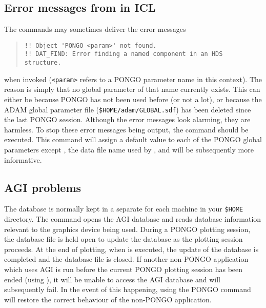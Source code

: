 \subsection{Error messages from  in ICL}

The commands  may sometimes deliver the error messages
\begin{quote}
\begin{verbatim}
!! Object 'PONGO_<param>' not found.
!! DAT_FIND: Error finding a named component in an HDS structure.
\end{verbatim}
\end{quote}
when invoked (\verb+<param>+ refers to a PONGO parameter name in this
context).
The reason is simply that no global parameter of that name currently exists.
This can either be because PONGO has not been used before (or not a lot),
or because the ADAM global parameter file (\verb+$HOME/adam/GLOBAL.sdf+) has
been deleted since the last PONGO session.
Although the error messages look alarming, they are harmless.
To stop these error messages being output, the command 
should be executed.
This command will assign a default value to each of the PONGO global parameters
except , the data file name used by , and
 will be subsequently more informative.


\subsection{AGI problems}

The  database is normally kept in a separate
  for each machine in your
\verb+$HOME+ directory.  The command  opens the
AGI database and reads database information relevant to the graphics
device being used.  During a PONGO plotting session, the database file
is held open to update the database as the plotting session proceeds.
At the end of plotting, when  is executed, the
update of the database is completed and the database file is closed.
If another non-PONGO application which uses AGI is run before the
current PONGO plotting session has been ended (\ie using
), it will be unable to access the AGI database and will
subsequently fail.  In the event of this happening, using the PONGO
 command will restore the correct behaviour of the
non-PONGO application.

